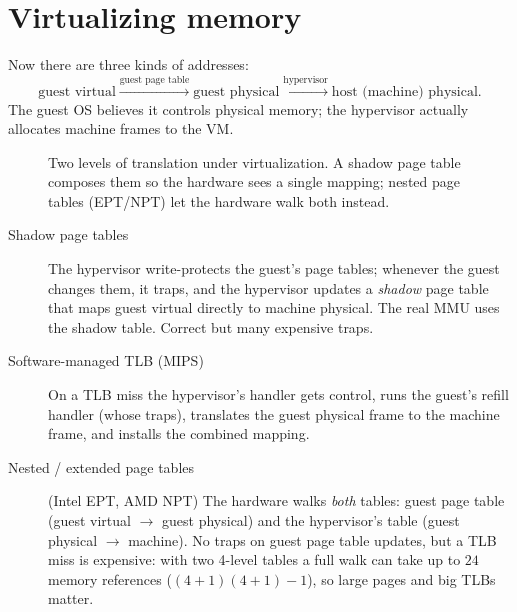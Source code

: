 \section{Virtualizing memory}

Now there are three kinds of addresses:
\[
  \text{guest virtual} \xrightarrow{\text{guest page table}} \text{guest physical}
  \xrightarrow{\text{hypervisor}} \text{host (machine) physical}.
\]
The guest OS believes it controls physical memory; the hypervisor actually allocates machine
frames to the VM.

\begin{figure}[H]
\centering
{}
\caption{Two levels of translation under virtualization. A shadow page
table composes them so the hardware sees a single mapping; nested page
tables (EPT/NPT) let the hardware walk both instead.}
\end{figure}

\begin{description}
  \item[Shadow page tables] The hypervisor write-protects the guest's page tables; whenever
    the guest changes them, it traps, and the hypervisor updates a \emph{shadow} page table that
    maps guest virtual directly to machine physical. The real MMU uses the shadow table. Correct
    but many expensive traps.
  \item[Software-managed TLB (MIPS)] On a TLB miss the hypervisor's handler gets control, runs the
    guest's refill handler (whose  traps), translates the guest physical frame to the
    machine frame, and installs the combined mapping.
  \item[Nested / extended page tables] (Intel EPT, AMD NPT) The hardware walks \emph{both}
    tables: guest page table (guest virtual $\to$ guest physical) and the hypervisor's table
    (guest physical $\to$ machine). No traps on guest page table updates, but a TLB miss is
    expensive: with two 4-level tables a full walk can take up to $24$ memory references
    ($(4+1)(4+1)-1$), so large pages and big TLBs matter.
\end{description}

